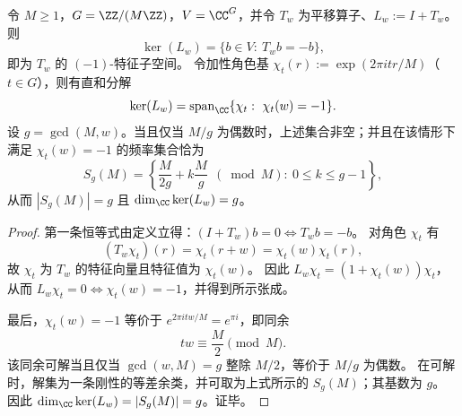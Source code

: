 \begin{proposition}\label{prop:fold-translation-kernel-fourier-sgM}
令 \(M\ge 1\)，\(G=\ZZ/(M\ZZ)\)，\(V=\CC^{G}\)，并令 \(T_w\) 为平移算子、\(L_w:=I+T_w\)。
则
\[
\ker(L_w)=\{b\in V:\ T_w b=-b\},
\]
即为 \(T_w\) 的 \((-1)\)-特征子空间。
令加性角色基 \(\chi_t(r):=\exp(2\pi i tr/M)\)（\(t\in G\)），则有直和分解
\[
\ker(L_w)=\mathrm{span}_{\CC}\{\chi_t:\ \chi_t(w)=-1\}.
\]
设 \(g=\gcd(M,w)\)。当且仅当 \(M/g\) 为偶数时，上述集合非空；并且在该情形下满足 \(\chi_t(w)=-1\) 的频率集合恰为
\[
S_g(M)=\left\{\frac{M}{2g}+k\frac{M}{g}\ \ (\bmod M):\ 0\le k\le g-1\right\},
\]
从而 \(|S_g(M)|=g\) 且 \(\dim_{\CC}\ker(L_w)=g\)。
\end{proposition}

\begin{proof}
第一条恒等式由定义立得：\((I+T_w)b=0\iff T_wb=-b\)。
对角色 \(\chi_t\) 有
\[
(T_w\chi_t)(r)=\chi_t(r+w)=\chi_t(w)\chi_t(r),
\]
故 \(\chi_t\) 为 \(T_w\) 的特征向量且特征值为 \(\chi_t(w)\)。
因此
\(
L_w\chi_t=(1+\chi_t(w))\chi_t
\)，从而 \(L_w\chi_t=0\iff \chi_t(w)=-1\)，并得到所示张成。
\par
最后，\(\chi_t(w)=-1\) 等价于 \(e^{2\pi i tw/M}=e^{\pi i}\)，即同余
\[
tw\equiv \frac{M}{2}\pmod M.
\]
该同余可解当且仅当 \(\gcd(w,M)=g\) 整除 \(M/2\)，等价于 \(M/g\) 为偶数。
在可解时，解集为一条刚性的等差余类，并可取为上式所示的 \(S_g(M)\)；其基数为 \(g\)。
因此 \(\dim_{\CC}\ker(L_w)=|S_g(M)|=g\)。证毕。
\end{proof}

\endinput
